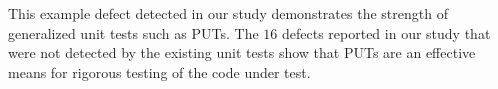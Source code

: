 This example defect detected in our study demonstrates the strength of generalized unit tests such as PUTs. The $16$ defects reported in our study that were not detected by the existing unit tests show that PUTs are an effective means for rigorous testing of the code under test.  
%
%
